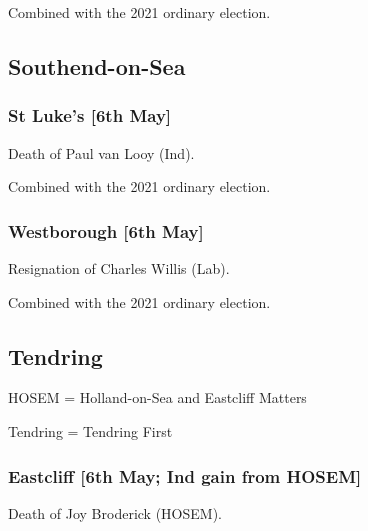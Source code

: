 \documentclass[a4paper,openany]{book}
\begin{document}
\begin{resultsiii}
Combined with the 2021 ordinary election.

\subsection*{Southend-on-Sea}

\subsubsection*{St Luke's \hspace*{\fill}\nolinebreak[1]%
	\enspace\hspace*{\fill}
	[6th May]}


Death of Paul van Looy (Ind).

Combined with the 2021 ordinary election.

\subsubsection*{Westborough \hspace*{\fill}\nolinebreak[1]%
	\enspace\hspace*{\fill}
	[6th May]}


Resignation of Charles Willis (Lab).

Combined with the 2021 ordinary election.

\subsection*{Tendring}

HOSEM = Holland-on-Sea and Eastcliff Matters

Tendring = Tendring First

\subsubsection*{Eastcliff \hspace*{\fill}\nolinebreak[1]%
	\enspace\hspace*{\fill}
	[6th May; Ind gain from HOSEM]}


Death of Joy Broderick (HOSEM).


\end{resultsiii}
\end{document}
